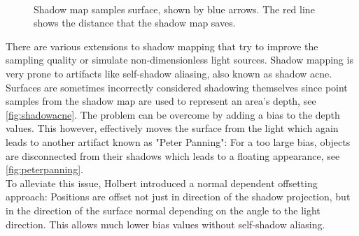\documentclass[thesis.tex]{subfiles}
\begin{document}
\begin{figure}[h]
\centering
{}
\\
\caption{\cite[p.351]{bib:RealtimeRenderingBook} Shadow map samples surface, shown by blue arrows. The red line shows the distance that the shadow map saves.}
\end{figure}
There are various extensions to shadow mapping that try to improve the sampling quality or simulate non-dimensionless light sources.
Shadow mapping is very prone to artifacts like self-shadow aliasing, also known as shadow acne.
Surfaces are sometimes incorrectly considered shadowing themselves since point samples from the shadow map are used to represent an area's depth, see \autoref{fig:shadowacne}.
The problem can be overcome by adding a bias to the depth values.
This however, effectively moves the surface from the light which again leads to another artifact known as "Peter Panning":
For a too large bias, objects are disconnected from their shadows which leads to a floating appearance, see \autoref{fig:peterpanning}.
\\
To alleviate this issue, Holbert \cite{bib:normaloffsetshadowmapping} introduced a normal dependent offsetting approach:
Positions are offset not just in direction of the shadow projection, but in the direction of the surface normal depending on the angle to the light direction.
This allows much lower bias values without self-shadow aliasing.
\end{document}
